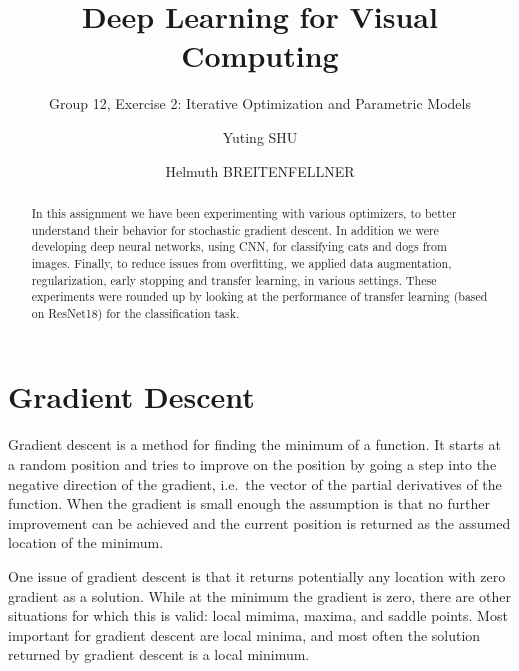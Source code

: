 \documentclass[sigconf,nonacm]{acmart}
\begin{document}
\title{Deep Learning for Visual Computing}
\subtitle{Group 12, Exercise 2: Iterative Optimization and Parametric Models}
\author{Yuting SHU}
\author{Helmuth BREITENFELLNER}
\begin{abstract}
In this assignment we have been experimenting with various optimizers,
to better understand their behavior for stochastic gradient
descent.
In addition we were developing deep neural networks, using CNN,
for classifying cats and dogs from images.
Finally, to reduce issues from overfitting, we applied data augmentation,
regularization, early stopping and transfer learning, in various settings.
These experiments were rounded up by looking at the performance of transfer
learning (based on ResNet18) for the classification task.
\end{abstract}
\maketitle

\section{Gradient Descent}

Gradient descent is a method for finding the minimum of a function.
It starts at a random position and tries to improve on the position
by going a step into the negative direction of the gradient,
i.e.\ the vector of the partial derivatives of the function.
When the gradient is small enough the assumption is that no further improvement
can be achieved and the current position is returned as the assumed location
of the minimum.

One issue of gradient descent is that it returns potentially any location with zero
gradient as a solution. While at the minimum the gradient is zero, there
are other situations for which this is valid: local mimima, maxima, and saddle points.
Most important for gradient descent are local minima, and most often the solution
returned by gradient descent is a local minimum.
\end{document}
